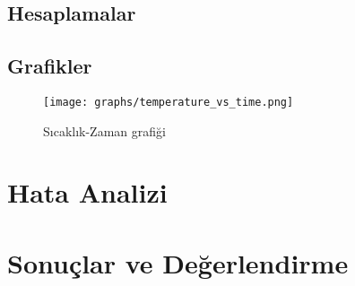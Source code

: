 \documentclass[12pt,a4paper]{article}
\begin{document}
\subsection{Hesaplamalar}

\subsection{Grafikler}
\begin{figure}[H]
\centering
\texttt{[image: graphs/temperature\_vs\_time.png]}
\caption{Sıcaklık-Zaman grafiği}
\end{figure}

\section{Hata Analizi}

\section{Sonuçlar ve Değerlendirme}
\end{document}
